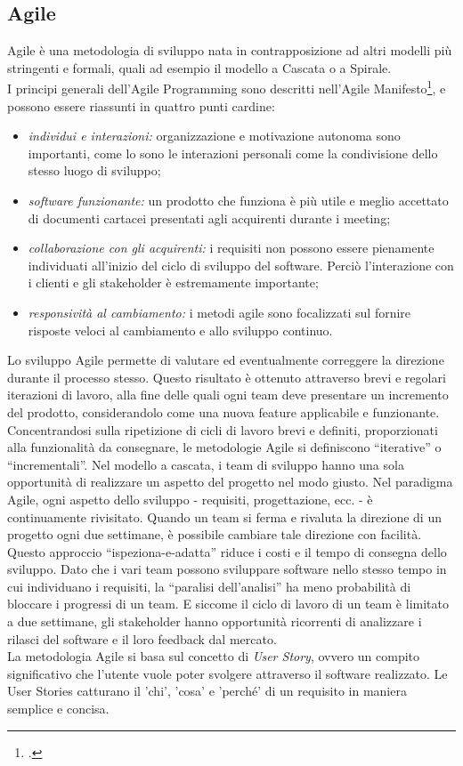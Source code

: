 \subsection{Agile}
Agile è una metodologia di sviluppo nata in contrapposizione ad altri modelli più stringenti e formali, quali ad esempio il modello a Cascata o a Spirale.\\
I principi generali dell’Agile Programming sono descritti nell’Agile Manifesto\footcite{site:agile-manifesto}, e possono essere riassunti in quattro punti cardine:
\begin{itemize}
	\item \emph{individui e interazioni:} organizzazione e motivazione autonoma sono importanti, come lo sono le interazioni personali come la condivisione dello stesso luogo di sviluppo;
	\item \emph{software funzionante:} un prodotto che funziona è più utile e meglio accettato di documenti cartacei presentati agli acquirenti durante i meeting;
	\item \emph{collaborazione con gli acquirenti:} i requisiti non possono essere pienamente individuati all’inizio del ciclo di sviluppo del software. Perciò l’interazione con i clienti e gli stakeholder è estremamente importante;
	\item \emph{responsività al cambiamento:} i metodi agile sono focalizzati sul fornire risposte veloci al cambiamento e allo sviluppo continuo.
\end{itemize}
Lo sviluppo Agile permette di valutare ed eventualmente correggere la direzione durante il processo stesso. Questo risultato è ottenuto attraverso brevi e regolari iterazioni di lavoro, alla fine delle quali ogni team deve presentare un incremento del prodotto, considerandolo come una nuova feature applicabile e funzionante. Concentrandosi sulla ripetizione di cicli di lavoro brevi e definiti, proporzionati alla funzionalità da consegnare, le metodologie Agile si definiscono “iterative” o “incrementali”. Nel modello a cascata, i team di sviluppo hanno una sola opportunità di realizzare un aspetto del progetto nel modo giusto. Nel paradigma Agile, ogni aspetto dello sviluppo - requisiti, progettazione, ecc. - è continuamente rivisitato. Quando un team si ferma e rivaluta la direzione di un progetto ogni due settimane, è possibile cambiare tale direzione con facilità.\\
Questo approccio “ispeziona-e-adatta” riduce i costi e il tempo di consegna dello sviluppo. Dato che i vari team possono sviluppare software nello stesso tempo in cui individuano i requisiti, la “paralisi dell’analisi” ha meno probabilità di bloccare i progressi di un team. E siccome il ciclo di lavoro di un team è limitato a due settimane, gli stakeholder hanno opportunità ricorrenti di analizzare i rilasci del software e il loro feedback dal mercato.\\
La metodologia Agile si basa sul concetto di \emph{User Story}, ovvero un compito significativo che l'utente vuole poter svolgere attraverso il software realizzato. Le User Stories catturano il 'chi', 'cosa' e 'perché' di un requisito in maniera semplice e concisa.

